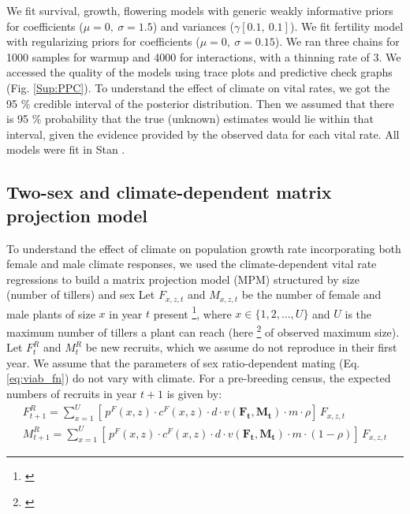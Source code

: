 \documentclass[12pt]{article}\usepackage[]{graphicx}\usepackage[dvipsnames]{xcolor}
\newcommand{\tom}[2]{{\color{red}{#1}}\footnote{\textit{\color{red}{#2}}}}
\begin{document}
We fit survival, growth, flowering models with generic weakly informative priors for coefficients ($\mu = 0,\ \sigma = 1.5$) and variances ($\gamma [0.1,\ 0.1]$).
We fit fertility model with regularizing priors for coefficients ($\mu = 0,\ \sigma = 0.15$).
We ran three chains for 1000 samples for warmup and 4000 for interactions, with a thinning rate of 3.
We accessed the quality of the models using trace plots and predictive check graphs \citep{piironen2017comparison} (Fig. \ref{Sup:PPC}).
To understand the effect of climate on vital rates, we got the 95 \% credible interval of the posterior distribution.  
Then we assumed that there is 95 \% probability that the true (unknown) estimates would lie within that interval, given the evidence provided by the observed data for each vital rate.
All models were fit in Stan \citep{rstan}. 

\subsection*{Two-sex and climate-dependent matrix projection model}
To understand the effect of climate on population growth rate incorporating both female and male climate responses, we used the climate-dependent vital rate regressions to build a matrix projection model (MPM) structured by size (number of tillers) and sex  
Let $F_{x,z,t}$ and $M_{x,z,t}$ be the number of female and male plants of size $x$ in year $t$ present \tom{at a location that has $z$ as climate}{The variable $z$ is not used consistently or correctly. Notice in eq:viabMPM and eq:dynamics you use $z$ in the RHS but not the LHS. CLimate is not a state variable.}, where $x \in \{1,2,...,U\}$ and $U$ is the maximum number of tillers a plant can reach (here \tom{95th percentile}{I remember you experimented with this. Is this the actual percentile you used or was this text from the Am Nat paper?} of observed maximum size).
Let $F^{R}_{t}$ and $M^{R}_{t}$ be new recruits, which we assume do not reproduce in their first year.
We assume that the parameters of sex ratio-dependent mating (Eq. \ref{eq:viab_fn}) do not vary with climate.  
For a pre-breeding census, the expected numbers of recruits in year $t+1$ is given by:
\begin{align}\label{eq:recruits}
F^{R}_{t+1} = \sum_{x=1}^{U} 	[ \, p^{F}(x,z) \cdot c^{F}(x,z) \cdot d \cdot v(\mathbf{F_{t}},\mathbf{M_{t}}) \cdot m \cdot \rho 	] \, F_{x,z,t}
\\
M^{R}_{t+1} = \sum_{x=1}^{U} 	[ \, p^{F}(x,z) \cdot c^{F}(x,z) \cdot d \cdot v(\mathbf{F_{t}},\mathbf{M_{t}}) \cdot m \cdot (1-\rho) 	] \, F_{x,z,t}
\end{align}
\end{document}
